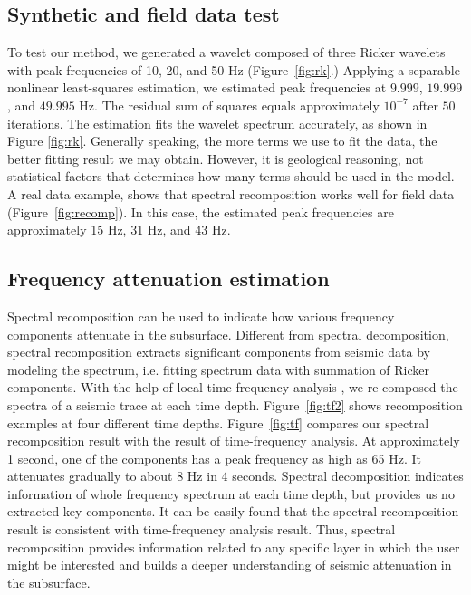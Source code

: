 \subsection{Synthetic and field data test}
To test our method, we generated a wavelet composed of three Ricker wavelets with peak frequencies of 10, 20, and 50 Hz (Figure~\ref{fig:rk}.) Applying a separable nonlinear least-squares estimation, we estimated peak frequencies at $9.999$, $19.999$, and $49.995$ Hz. The residual sum of squares equals approximately $10^{-7}$ after $50$ iterations. The estimation fits the wavelet spectrum accurately, as shown in Figure \ref{fig:rk}. Generally speaking, the more terms we use to fit the data, the better fitting result we may obtain. However, it is geological reasoning, not statistical factors that determines how many terms should be used in the model. A real data example, shows that spectral recomposition works well for field data (Figure~\ref{fig:recomp}). In this case, the estimated peak frequencies are approximately 15 Hz, 31 Hz, and 43 Hz.


\label{fig:recomp}

\subsection{Frequency attenuation estimation}
Spectral recomposition can be used to indicate how various frequency components attenuate in the subsurface. Different from spectral decomposition, spectral recomposition extracts significant components from seismic data by modeling the spectrum, i.e. fitting spectrum data with summation of Ricker components. With the help of local time-frequency analysis \cite[]{Fomel}, we re-composed the spectra of a seismic trace at each time depth. Figure~\ref{fig:tf2} shows recomposition examples at four different time depths. Figure~\ref{fig:tf} compares our spectral recomposition result with the result of time-frequency analysis. At approximately 1 second, one of the components has a peak frequency as high as 65 Hz. It attenuates gradually to about 8 Hz in 4 seconds. Spectral decomposition indicates information of whole frequency spectrum at each time depth, but provides us no extracted key components. It can be easily found that the spectral recomposition result is consistent with time-frequency analysis result. Thus, spectral recomposition provides information related to any specific layer in which the user might be interested and builds a deeper understanding of seismic attenuation in the subsurface.

